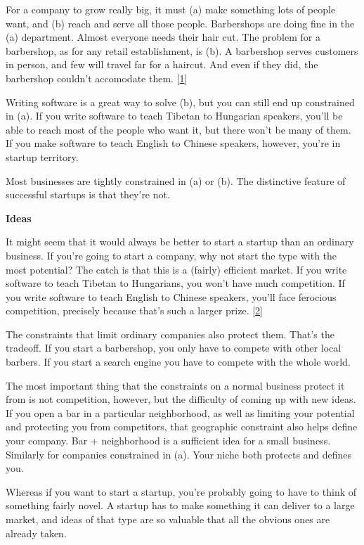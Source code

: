 For a company to grow really big, it must (a) make something lots
of people want, and (b) reach and serve all those people.  Barbershops
are doing fine in the (a) department.  Almost everyone needs their
hair cut.  The problem for a barbershop, as for any retail
establishment, is (b).  A barbershop serves customers in person,
and few will travel far for a haircut.  And even if they did, the
barbershop couldn't accomodate them. 
[\href{\#f1n}{1}]

Writing software is a great way to solve (b), but you can still end
up constrained in (a).  If you write software to teach Tibetan to
Hungarian speakers, you'll be able to reach most of the people who
want it, but there won't be many of them.   If you make software
to teach English to Chinese speakers, however, you're in startup
territory.

Most businesses are tightly constrained in (a) or (b).  The distinctive
feature of successful startups is that they're not.


\textbf{Ideas}

It might seem that it would always be better to start a startup
than an ordinary business.  If you're going to start a company, why
not start the type with the most potential?  The catch is that this
is a (fairly) efficient market.   If you write software to teach
Tibetan to Hungarians, you won't have much competition.  If you
write software to teach English to Chinese speakers, you'll face
ferocious competition, precisely because that's such a larger prize.
[\href{\#f2n}{2}]

The constraints that limit ordinary companies also protect them.
That's the tradeoff.  If you start a barbershop, you only have to
compete with other local barbers.  If you start a search engine you
have to compete with the whole world.

The most important thing that the constraints on a normal business
protect it from is not competition, however, but the difficulty of
coming up with new ideas.  If you open a bar in a particular
neighborhood, as well as limiting your potential and protecting you
from competitors, that geographic constraint also helps define your
company.  Bar + neighborhood is a sufficient idea for a small
business.  Similarly for companies constrained in (a).  Your niche
both protects and defines you.

Whereas if you want to start a startup, you're probably going to
have to think of something fairly novel.  A startup has to make
something it can deliver to a large market, and ideas of that type
are so valuable that all the obvious ones are already taken.

